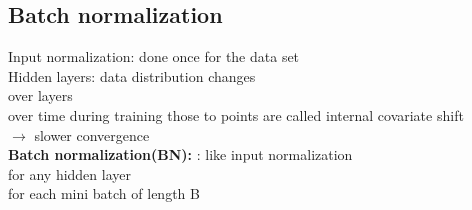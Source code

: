 \subsection{Batch normalization}
Input normalization: done once for the data set \\
Hidden layers: data distribution changes\\
\textbullet over layers  \\
\textbullet over time during training 
those to points are called internal covariate shift \\
$ \rightarrow $ slower convergence  \\
\textbf{Batch normalization(BN):} : like input normalization \\
\textbullet for any hidden layer \\
\textbullet for each mini batch of length B \\
 \\
 \\
